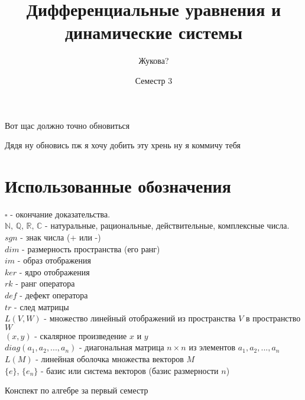 \documentclass[a4paper]{book}
\title{Дифференциальные уравнения и динамические системы}
\date{Семестр 3}
\author{Жукова?}
\begin{document}
\maketitle
\tableofcontents
\newpage

Вот щас должно точно обновиться

Дядя ну обновись пж я хочу добить эту хрень ну я коммичу тебя
\section{Использованные обозначения}
$\square$ - окончание доказательства. \\
$\mathbb N,\,\mathbb Q,\,\mathbb R,\,\mathbb C$ - натуральные, рациональные,
действительные, комплексные числа.\\
$sgn$ - знак числа (+ или -)\\
$dim$ - размерность пространства (его ранг)\\
$im$ - образ отображения\\
$ker$ - ядро отображения\\
$rk$ - ранг оператора\\
$def$ - дефект оператора\\
$tr$ - след матрицы\\
$L(V,W)$ - множество линейный отображений из пространства $V$ в 
пространство $W$\\
$(x,y)$ - скалярное произведение $x$ и $y$\\
$diag(a_1,a_2,...,a_n)$ - диагональная матрица $n\times n$ из элементов
$a_1,a_2,...,a_n$\\
$L(M)$ - линейная оболочка множества векторов $M$\\
$\{e\}$, $\{e_n\}$ - базис или система векторов (базис размерности $n$)\\

\begin{thebibliography}{}
Конспект по алгебре за первый семестр
\end{thebibliography}
\end{document}

